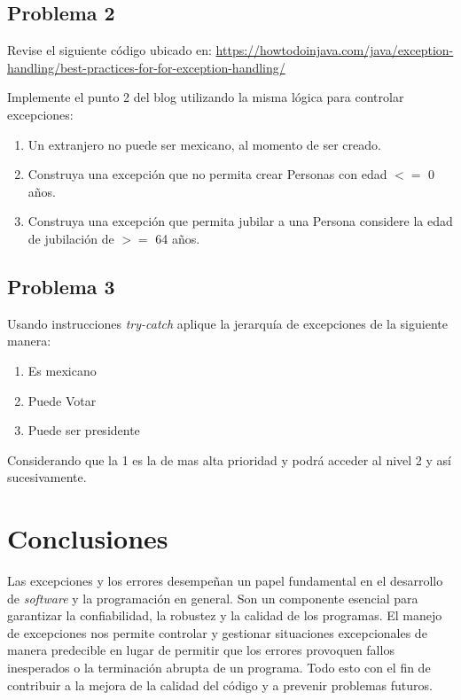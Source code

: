 \documentclass[11pt, twocolumn]{article}
\begin{document}
  \subsection*{Problema 2}
  Revise el siguiente código ubicado en: \url{https://howtodoinjava.com/java/exception-handling/best-practices-for-for-exception-handling/}

  Implemente el punto 2 del blog utilizando la misma lógica para controlar excepciones:

  \begin{enumerate}[label=\alph*)]
    \item Un extranjero no puede ser mexicano, al momento de ser creado.
    \item Construya una excepción que no permita crear Personas con edad $<=$ 0 años.
    \item Construya una excepción que permita jubilar a una Persona considere la edad de jubilación de $>=$ 64 años.
  \end{enumerate}
  

  \subsection*{Problema 3}
  Usando instrucciones \textit{try-catch} aplique la jerarquía de excepciones de la siguiente manera:

  \begin{enumerate}
    \item Es mexicano
    \item Puede Votar
    \item Puede ser presidente
  \end{enumerate}

  Considerando que la 1 es la de mas alta prioridad y podrá acceder al nivel 2 y así sucesivamente.


  \section*{Conclusiones}
  Las excepciones y los errores desempeñan un papel fundamental en el desarrollo de \textit{software} y la programación en general. Son un componente esencial para garantizar la confiabilidad, la robustez y la calidad de los programas. El manejo de excepciones nos permite controlar y gestionar situaciones excepcionales de manera predecible en lugar de permitir que los errores provoquen fallos inesperados o la terminación abrupta de un programa. Todo esto con el fin de contribuir a la mejora de la calidad del código y a prevenir problemas futuros.
\end{document}
